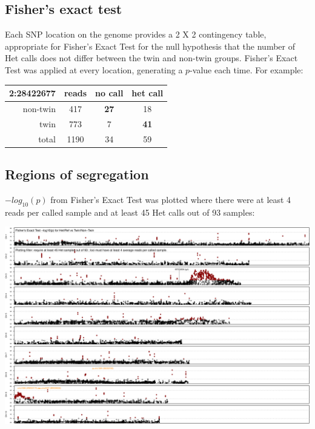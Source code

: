 \documentclass[a0,25pt]{sciposter}
\newlength{\figwidth}
\begin{document}
\begin{multicols}{3}
  \subsection*{Fisher's exact test}

  Each SNP location on the genome provides a 2 X 2 contingency table, appropriate for Fisher's Exact Test
  for the null hypothesis that the number of Het calls does not differ between the twin and non-twin groups.
  Fisher's Exact Test was applied at every location, generating a $p$-value each time. For example:

  \begin{center}
    \begin{tabular}{|r|c||c|c|}
      \hline
      \textbf{2:28422677} & reads & no call & het call \\
      \hline
      \hline
      non-twin   & 417   & \textbf{27} & 18 \\
      \hline
      twin       & 773   & 7  & \textbf{41} \\
      \hline
      \hline
      total      & 1190  & 34 & 59 \\
      \hline
    \end{tabular}
  \end{center}


  \subsection*{Regions of segregation}

  $-log_{10}(p)$ from Fisher's Exact Test was plotted where there were at least 4 reads per called sample and at least 45 Het calls out of 93 samples:
  
  \begin{center}
    \includegraphics[width=\figwidth]{Fisher-Het-45}
  \end{center}


\end{multicols}
\end{document}
